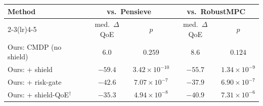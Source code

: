 \begin{tabular}{@{}lcccc@{}}
\toprule
Method & \multicolumn{2}{c}{vs.\ Pensieve} & \multicolumn{2}{c}{vs.\ RobustMPC} \\
\cmidrule(lr){2-3}\cmidrule(lr){4-5}
 & med.\ $\Delta$QoE & $p$ & med.\ $\Delta$QoE & $p$ \\
\midrule
Ours: CMDP (no shield) & $6.0$ & $0.259$ & $8.6$ & $0.124$ \\
Ours: + shield & $-59.4$ & $3.42\times10^{-10}$ & $-55.7$ & $1.34\times10^{-9}$ \\
Ours: + risk-gate & $-42.6$ & $7.07\times10^{-7}$ & $-37.9$ & $6.90\times10^{-7}$ \\
Ours: + shield-QoE$^{\dagger}$ & $-35.3$ & $4.94\times10^{-8}$ & $-40.9$ & $7.31\times10^{-6}$ \\
\bottomrule
\end{tabular}
